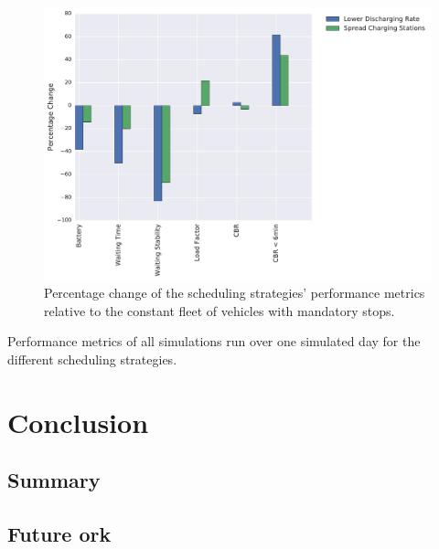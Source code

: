 \documentclass[12pt,a4paper]{article}
\begin{document}
\begin{figure}
  \centering
\includegraphics[scale=0.55]{./images/batteryCompare.pdf}
  \caption{Percentage change of the scheduling strategies' performance metrics relative to the constant fleet of vehicles with mandatory stops.}
\label{batterycompare}
\end{figure}

\begin{table}
\center
{}
\caption{Performance metrics of all simulations run over one simulated day for the different scheduling strategies.}
\end{table}

\section{Conclusion}\label{conclusion}

\subsection{Summary}\label{summary}
\subsection{Future ork}\label{futurework}

\newpage


\end{document}
